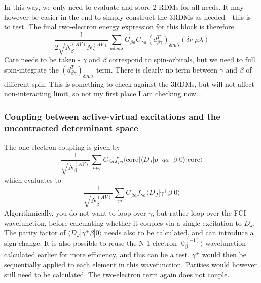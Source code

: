 \documentclass[a4paper,oneside,11pt]{article}
\numberwithin{equation}{section}
\newcommand{\DMETKet}{|0\rangle| \mathrm{core} \rangle}
\begin{document}
In this way, we only need to evaluate and store 2-RDMs for all needs. It may however be easier in the end to simply construct the 3RDMs as needed - this is to test.
The final two-electron energy expression for this block is therefore
\begin{equation}
\frac{1}{2 \sqrt{N^{(AV)}_{\beta}N^{(AV)}_{\gamma}}} \sum_{a \delta \nu \mu \lambda} G_{\beta a} G_{\gamma a} (d^T_{\beta \gamma})_{\delta \nu \mu \lambda} (\delta \nu | \mu \lambda)
\end{equation}
Care needs to be taken - $\gamma$ and $\beta$ correspond to spin-orbitals, but we need to full spin-integrate the $(d^T_{\beta \gamma})_{\delta \nu \mu \lambda}$ term. There is clearly no term
between $\gamma$ and $\beta$ of different spin. This is something to check against
the 3RDMs, but will not affect non-interacting limit, so not my first place I am checking now...

\subsubsection{Coupling between active-virtual excitations and the uncontracted determinant space}
The one-electron coupling is given by
\begin{equation}
\frac{1}{\sqrt{N_{\beta}^{(AV)}}} \sum_{apq} G_{\beta a} f_{pq} \langle \textrm{core} | \langle D_J | p^{+} q a^{+} \beta \DMETKet
\end{equation}
which evaluates to
\begin{equation}
\frac{1}{\sqrt{N_{\beta}^{(AV)}}} \sum_{\gamma a} G_{\beta a} f_{\gamma a} \langle D_J | \gamma^{+} \beta | 0 \rangle
\end{equation}
Algorithmically, you do not want to loop over $\gamma$, but rather loop over the FCI wavefunction, before calculating whether it couples via a single excitation to $D_J$. The parity factor of 
$\langle D_J | \gamma^{+} \beta | 0 \rangle$ needs also to be calculated, and can introduce a sign change. It is also possible to reuse the N-1 electron $|0^{(-1)}_{\beta} \rangle$ wavefunction calculated
earlier for more efficiency, and this can be a test. $\gamma^{+}$ would then be sequentially applied to each element in this wavefunction. Parities would however still need to be calculated.
The two-electron term again does not couple.
\end{document}
